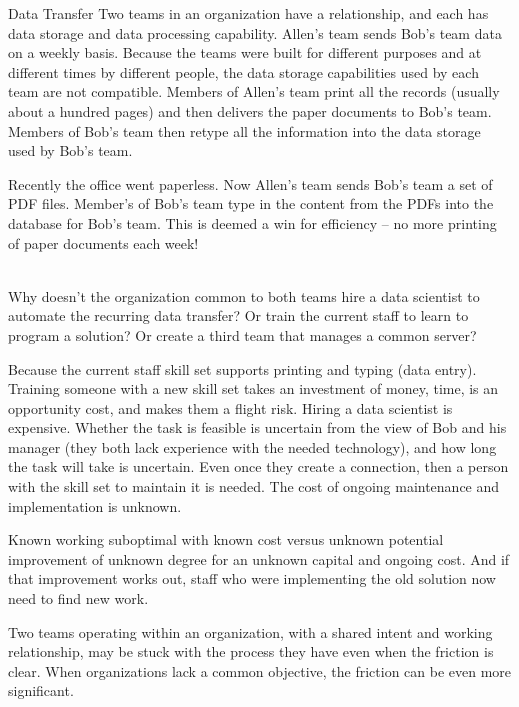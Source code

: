 \begin{storytime}{Data Transfer}
Two teams in an organization have a relationship, and each has data storage and data processing capability. Allen's team sends Bob's team data on a weekly basis. Because the teams were built for different purposes and at different times by different people, the data storage capabilities used by each team are not compatible. Members of Allen's team print all the records (usually about a hundred pages) and then delivers the paper documents to Bob's team. Members of Bob's team then retype all the information into the data storage used by Bob's team.

Recently the office went paperless. Now Allen's team sends Bob's team a set of PDF files. Member's of Bob's team type in the content from the PDFs into the database for Bob's team. This is deemed a win for efficiency -- no more printing of paper documents each week!

\ \\

Why doesn't the organization common to both teams hire a data scientist to automate the recurring data transfer? Or train the current staff to learn to program a solution? Or create a third team that manages a common server?

Because the current staff skill set supports printing and typing (data entry). Training someone with a new skill set takes an investment of money, time, is an opportunity cost, and makes them a flight risk.
Hiring a data scientist is expensive. Whether the task is feasible is uncertain from the view of Bob and his manager (they both lack experience with the needed technology), and how long the task will take is uncertain. Even once they create a connection, then a person with the skill set to maintain it is needed. The cost of ongoing maintenance and implementation is unknown.

Known working suboptimal with known cost versus unknown potential improvement of unknown degree for an unknown capital and ongoing cost. And if that improvement works out, staff who were implementing the old solution now need to find new work.
\end{storytime}

Two teams operating within an organization, with a shared intent and working relationship, may be stuck with the process they have even when the friction is clear. When organizations lack a common objective, the friction can be even more significant. 

